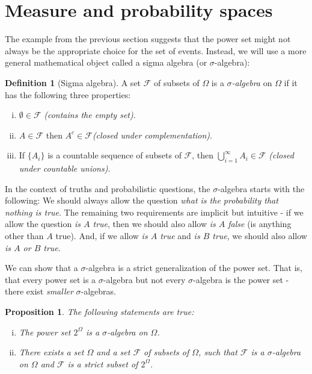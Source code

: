 \documentclass{book}
\theoremstyle{plain}%
\newtheorem{proposition}{Proposition}[section]
\theoremstyle{definition}
\newtheorem{definition}{Definition}[section]
\begin{document}
\section{Measure and probability spaces}

The example from the previous section suggests that the power set might not always be the appropriate choice for the set of events. Instead, we will use a more general mathematical object called a sigma algebra (or $\sigma$-algebra): 

\begin{definition}[Sigma algebra]
A set $\mathcal{F}$ of subsets of $\Omega$ is a \emph{$\sigma$-algebra} on $\Omega$ if it has the following three properties:

\begin{enumerate}[(i)]
\item $\emptyset \in  \mathcal{F}$ \emph{(contains the empty set)}.
\item $A \in \mathcal{F}$ then $A^c \in \mathcal{F}$\emph{(closed under complementation)}.
\item If $\{A_i\}$ is a countable sequence of subsets of $\mathcal{F}$,  then $\bigcup_{i=1}^\infty A_i \in \mathcal{F}$ \emph{(closed under countable unions)}.
\end{enumerate}
\end{definition}

In the context of truths and probabilistic questions, the $\sigma$-algebra starts with the following: We should always allow the question \emph{what is the probability that nothing is true}. The remaining two requirements are implicit but intuitive - if we allow the question \emph{is $A$ true}, then we should also allow \emph{is $A$ false} (is anything other than $A$ true). And, if we allow \emph{is $A$ true} and \emph{is $B$ true}, we should also allow \emph{is $A$ or $B$ true}.

We can show that a $\sigma$-algebra is a strict generalization of the power set. That is, that every power set is a $\sigma$-algebra but not every $\sigma$-algebra is the power set - there exist \emph{smaller} $\sigma$-algebras.

\begin{proposition}
The following statements are true:
\begin{enumerate}[(i)]
\item The power set $2^\Omega$ is a $\sigma$-algebra on $\Omega$.
\item There exists a set $\Omega$ and a set $\mathcal{F}$ of subsets of $\Omega$, such that $\mathcal{F}$ is a $\sigma$-algebra on $\Omega$ and $\mathcal{F}$ is a strict subset of $2^\Omega$.
\end{enumerate}
\label{prop:001a}
\end{proposition}
\end{document}
